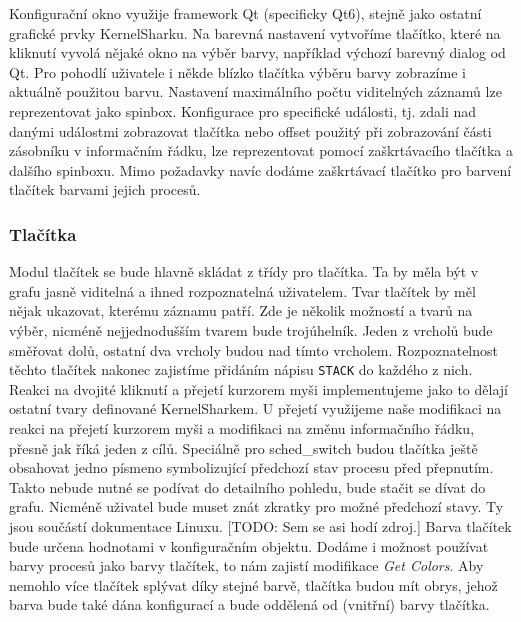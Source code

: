 Konfigurační okno využije framework Qt (specificky Qt6), stejně jako ostatní grafické prvky KernelSharku. Na barevná nastavení vytvoříme tlačítko, které na kliknutí vyvolá nějaké okno na výběr barvy, například výchozí barevný dialog od Qt. Pro pohodlí uživatele i někde blízko tlačítka výběru barvy zobrazíme i aktuálně použitou barvu. Nastavení maximálního počtu viditelných záznamů lze reprezentovat jako spinbox. Konfigurace pro specifické události, tj. zdali nad danými událostmi zobrazovat tlačítka nebo offset použitý při zobrazování části zásobníku v informačním řádku, lze reprezentovat pomocí zaškrtávacího tlačítka a dalšího spinboxu. Mimo požadavky navíc dodáme zaškrtávací tlačítko pro barvení tlačítek barvami jejich procesů.

\subsubsection{Tlačítka}
Modul tlačítek se bude hlavně skládat z třídy pro tlačítka. Ta by měla být v grafu jasně viditelná a ihned rozpoznatelná uživatelem. Tvar tlačítek by měl nějak ukazovat, kterému záznamu patří. Zde je několik možností a tvarů na výběr, nicméně nejjednodušším tvarem bude trojúhelník. Jeden z vrcholů bude směřovat dolů, ostatní dva vrcholy budou nad tímto vrcholem. Rozpoznatelnost těchto tlačítek nakonec zajistíme přidáním nápisu \texttt{STACK} do každého z nich. Reakci na dvojité kliknutí a přejetí kurzorem myši implementujeme jako to dělají ostatní tvary definované KernelSharkem. U přejetí využijeme naše modifikaci na reakci na přejetí kurzorem myši a modifikaci na změnu informačního řádku, přesně jak říká jeden z cílů. Speciálně pro sched\_switch budou tlačítka ještě obsahovat jedno písmeno symbolizující předchozí stav procesu před přepnutím. Takto nebude nutné se podívat do detailního pohledu, bude stačit se dívat do grafu. Nicméně uživatel bude muset znát zkratky pro možné předchozí stavy. Ty jsou součástí dokumentace Linuxu. [TODO: Sem se asi hodí zdroj.] Barva tlačítek bude určena hodnotami v konfiguračním objektu. Dodáme i možnost používat barvy procesů jako barvy tlačítek, to nám zajistí modifikace \emph{Get Colors}. Aby nemohlo více tlačítek splývat díky stejné barvě, tlačítka budou mít obrys, jehož barva bude také dána konfigurací a bude oddělená od (vnitřní) barvy tlačítka.

